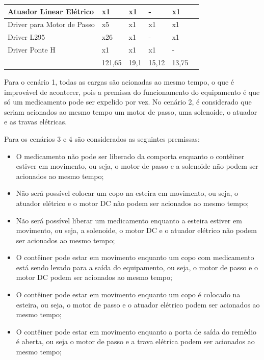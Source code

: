 \begin{table}[H]
\begin{adjustbox}{max width = \textwidth}
\begin{tabular}{|L{5cm}|C{2cm}|C{2cm}|C{2cm}|C{2cm}|C{2cm}|}
             \\ \hline
                 Atuador Linear Elétrico & x1 & x1 & - & x1
             \\ \hline
               Driver para Motor de Passo & x5 & x1 & x1 & x1
             \\ \hline
                Driver L295 & x26 & x1 & - & x1
             \\ \hline
                  Driver Ponte H & x1 & x1 & x1 & -
             \\ \hline
              & 121,65 & 19,1 & 15,12 & 13,75 \\
             \hline
        \end{tabular}
    \end{adjustbox}
\end{table}

Para o cenário 1, todas as cargas são acionadas ao mesmo tempo, o que é improvável de acontecer, pois a premissa do funcionamento do equipamento é que só um medicamento pode ser expelido por vez. No cenário 2, é considerado que seriam acionados ao mesmo tempo um motor de passo, uma solenoide, o atuador e as travas elétricas. 

Para os cenários 3 e 4 são considerados as seguintes premissas: 
    
    \begin{itemize}
        
        \item O medicamento não pode ser liberado da comporta enquanto o contêiner estiver em movimento, ou seja, o motor de passo e a solenoide não podem ser acionados ao mesmo tempo;
        
        \item Não será possível colocar um copo na esteira em movimento, ou seja, o atuador elétrico e o motor DC não podem ser acionados ao mesmo tempo;
        
        \item Não será possível liberar um medicamento enquanto a esteira estiver em movimento, ou seja, a solenoide, o motor DC e o atuador elétrico não podem ser acionados ao mesmo tempo;
        
        \item O contêiner pode estar em movimento enquanto um copo com medicamento está sendo levado para a saída do equipamento, ou seja, o motor de passo e o motor DC podem ser acionados ao mesmo tempo;
        
        \item O contêiner pode estar em movimento enquanto um copo é colocado na esteira, ou seja, o motor de passo e o atuador elétrico podem ser acionados ao mesmo tempo;
        
        \item O contêiner pode estar em movimento enquanto a porta de saída do remédio é aberta, ou seja o motor de passo e a trava elétrica podem ser acionados ao mesmo tempo;

    \end{itemize}

